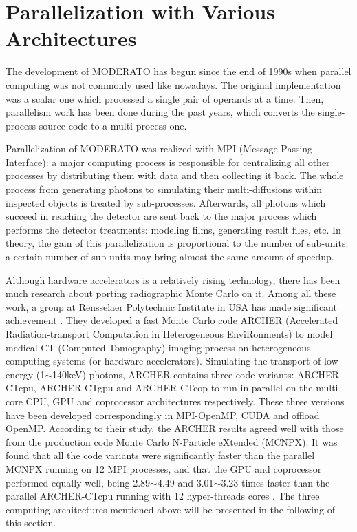 
\section{Parallelization with Various Architectures}
The development of MODERATO has begun since the end of 1990s when parallel computing was not commonly used like nowadays. The original implementation was a scalar one which processed a single pair of operands at a time. Then, parallelism work has been done during the past years, which converts the single-process source code to a multi-process one. 

Parallelization of MODERATO was realized with MPI (Message Passing Interface): a major computing process is responsible for centralizing all other processes by distributing them with data and then collecting it back. The whole process from generating photons to simulating their multi-diffusions within inspected objects is treated by sub-processes. Afterwards, all photons which succeed in reaching the detector are sent back to the major process which performs the detector treatments: modeling films, generating result files, etc. In theory, the gain of this parallelization is proportional to the number of sub-units: a certain number of sub-units may bring almost the same amount of speedup.

Although hardware accelerators is a relatively rising technology, there has been much research about porting radiographic Monte Carlo on it. Among all these work, a group at Rensselaer Polytechnic Institute in USA has made significant achievement \citep{xu2013update, liu2014comparison, su2014archerrt, liu2013tu}. They developed a fast Monte Carlo code ARCHER (Accelerated Radiation-transport Computation in Heterogeneous EnviRonments) to model medical CT (Computed Tomography) imaging process on heterogeneous computing systems (or hardware accelerators). Simulating the transport of low-energy (1$\sim$140keV) photons, ARCHER contains three code variants: ARCHER-CTcpu, ARCHER-CTgpu and ARCHER-CTcop to run in parallel on the multi-core CPU, GPU and coprocessor architectures respectively. These three versions have been developed correspondingly in MPI-OpenMP, CUDA and offload OpenMP. According to their study, the ARCHER results agreed well with those from the production code Monte Carlo N-Particle eXtended (MCNPX). It was found that all the code variants were significantly faster than the parallel MCNPX running on 12 MPI processes, and that the GPU and coprocessor performed equally well, being 2.89$\sim$4.49 and 3.01$\sim$3.23 times faster than the parallel ARCHER-CTcpu running with 12 hyper-threads cores \citep{liu2014comparison}. The three computing architectures mentioned above will be presented in the following of this section.

